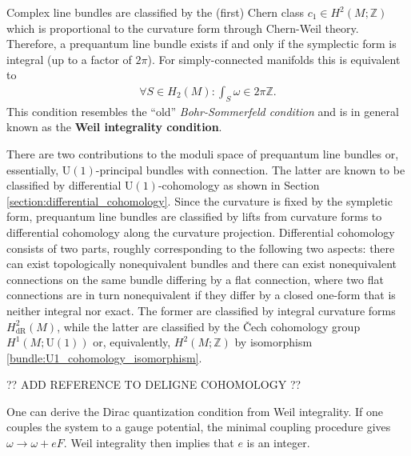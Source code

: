    \begin{property}
        Complex line bundles are classified by the (first) Chern class $c_1\in H^2(M;\mathbb{Z})$ which is proportional to the curvature form through Chern-Weil theory. Therefore, a prequantum line bundle exists if and only if the symplectic form is integral (up to a factor of $2\pi$). For simply-connected manifolds this is equivalent to
        \begin{gather}
            \forall S\in H_2(M):\int_S\omega\in 2\pi\mathbb{Z}.
        \end{gather}
        This condition resembles the ``old'' \textit{Bohr-Sommerfeld condition} and is in general known as the \textbf{Weil integrality condition}.

        There are two contributions to the moduli space of prequantum line bundles or, essentially, $\mathrm{U}(1)$-principal bundles with connection. The latter are known to be classified by differential $\mathrm{U}(1)$-cohomology as shown in Section \ref{section:differential_cohomology}. Since the curvature is fixed by the sympletic form, prequantum line bundles are classified by lifts from curvature forms to differential cohomology along the curvature projection. Differential cohomology consists of two parts, roughly corresponding to the following two aspects: there can exist topologically nonequivalent bundles and there can exist nonequivalent connections on the same bundle differing by a flat connection, where two flat connections are in turn nonequivalent if they differ by a closed one-form that is neither integral nor exact. The former are classified by integral curvature forms $H^2_\mathrm{dR}(M)$, while the latter are classified by the \v{C}ech cohomology group $H^1(M;\mathrm{U}(1))$ or, equivalently, $H^2(M;\mathbb{Z})$ by isomorphism \eqref{bundle:U1_cohomology_isomorphism}.

        ?? ADD REFERENCE TO DELIGNE COHOMOLOGY ??
    \end{property}
    \begin{result}
        One can derive the Dirac quantization condition from Weil integrality. If one couples the system to a gauge potential, the minimal coupling procedure gives $\omega\longrightarrow\omega+eF$. Weil integrality then implies that $e$ is an integer.
    \end{result}

